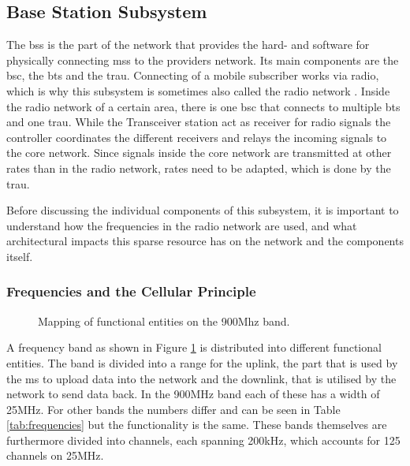 \subsection{Base Station Subsystem}
\label{sec:bss}
The \gls{bss} is the part of the network that provides the hard- and software for physically connecting \glspl{ms} to the providers network.
Its main components are the \gls{bsc}, the \gls{bts} and the \gls{trau}.
Connecting of a mobile subscriber works via radio, which is why this subsystem is sometimes also called the radio network \cite{kommsys2006}.
Inside the radio network of a certain area, there is one \gls{bsc} that connects to multiple \gls{bts} and one \gls{trau}.
While the Transceiver station act as receiver for radio signals the controller coordinates the different receivers and relays the incoming signals  to the core network.
Since signals inside the core network are transmitted at other rates than in the radio network, rates need to be adapted, which is done by the \gls{trau}.

Before discussing the individual components of this subsystem, it is important to understand how the frequencies in the radio network are used, and what architectural impacts this sparse resource has on the network and the components itself.

\subsubsection{Frequencies and the Cellular Principle}
\begin{figure}
\caption{Mapping of functional entities on the 900Mhz band.}
\label{fig:frequency}
\end{figure}

A frequency band as shown in Figure \ref{fig:frequency} is distributed into different functional entities.
The band is divided into a range for the uplink, the part that is used by the \gls{ms} to upload data into the network and the downlink, that is utilised by the network to send data back.
In the 900MHz band each of these has a width of 25MHz.
For other bands the numbers differ and can be seen in Table \ref{tab:frequencies} but the functionality is the same.
These bands themselves are furthermore divided into channels, each spanning 200kHz, which accounts for 125 channels on 25MHz.

